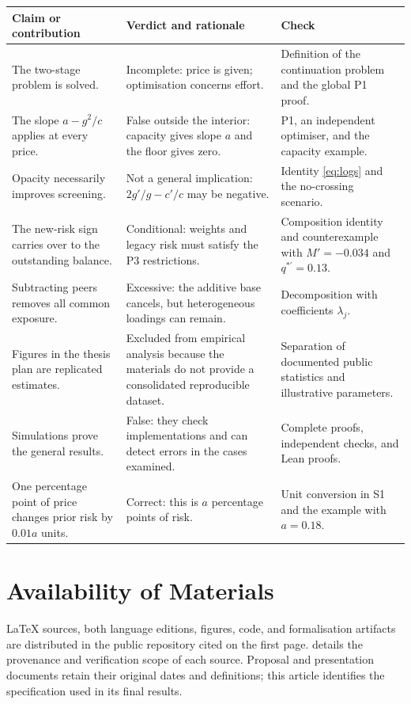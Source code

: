 \documentclass[11pt]{article}
\theoremstyle{definition}\newtheorem{assumption}{Assumption}
\begin{document}
\begin{longtable}{L{.29\linewidth}L{.29\linewidth}L{.33\linewidth}}
\toprule Claim or contribution & Verdict and rationale & Check\\\midrule
\endhead
The two-stage problem is solved. &
Incomplete: price is given; optimisation concerns effort. &
Definition of the continuation problem and the global P1 proof.\\
The slope $a-g^2/c$ applies at every price. &
False outside the interior: capacity gives slope $a$ and the floor gives zero. &
P1, an independent optimiser, and the capacity example.\\
Opacity necessarily improves screening. &
Not a general implication: $2g'/g-c'/c$ may be negative. &
Identity \eqref{eq:logs} and the no-crossing scenario.\\
The new-risk sign carries over to the outstanding balance. &
Conditional: weights and legacy risk must satisfy the P3 restrictions. &
Composition identity and counterexample with $M'=-0.034$ and $q^{*\prime}=0.13$.\\
Subtracting peers removes all common exposure. &
Excessive: the additive base cancels, but heterogeneous loadings can remain. &
Decomposition with coefficients $\lambda_j$.\\
Figures in the thesis plan are replicated estimates. &
Excluded from empirical analysis because the materials do not provide a consolidated reproducible dataset. &
Separation of documented public statistics and illustrative parameters.\\
Simulations prove the general results. &
False: they check implementations and can detect errors in the cases examined. &
Complete proofs, independent checks, and Lean proofs.\\
One percentage point of price changes prior risk by $0.01a$ units. &
Correct: this is $a$ percentage points of risk. &
Unit conversion in S1 and the example with $a=0.18$.\\
\bottomrule
\end{longtable}

\section{Availability of Materials}
LaTeX sources, both language editions, figures, code, and formalisation
artifacts are distributed in the public repository cited on the first page.
 details the provenance and verification scope of each
source. Proposal and presentation documents retain their original dates and
definitions; this article identifies the specification used in its final
results.
\end{document}
